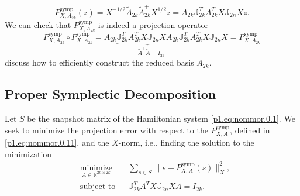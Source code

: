 \begin{equation} \label{p1.eq:nommor.0.11}
	P_{X,A_{2k}}^\text{symp}(z) = X^{-1/2} \tilde A_{2k} \tilde A_{2k}^+ X^{1/2} z = A_{2k} \mathbb J_{2k}^T A_{2k}^T X \mathbb J_{2n} X z.
\end{equation}
We can check that $P_{X,A_{2k}}^{\text{symp}}$ is indeed a projection operator
\begin{equation} \label{p1.eq:nommor.0.12}
	P_{X,A_{2k}}^\text{symp} \circ P_{X,A_{2k}}^\text{symp} = A_{2k} \underbrace{ \mathbb J_{2k}^T A_{2k}^T X \mathbb J_{2n} X A_{2k}}_{ =\tilde A^+ \tilde A = I_{2k} } \mathbb J_{2k}^T A_{2k}^T X \mathbb J_{2n} X = P_{X,A_{2k}}^\text{symp} 
\end{equation}
 discuss how to efficiently construct the reduced basis $A_{2k}$.

\subsection{Proper Symplectic Decomposition} \label{sec:normmor.1.1}
Let $S$ be the snapshot matrix of the Hamiltonian system \eqref{p1.eq:nommor.0.1}. We seek to minimize the projection error with respect to the $P_{X,A}^{\text{symp}}$, defined in \eqref{p1.eq:nommor.0.11}, and the $X$-norm, i.e., finding the solution to the minimization
\begin{equation} \label{eq:normmor.3}
\begin{aligned}
& \underset{A\in \mathbb{R}^{2n\times 2k}}{\text{minimize}}
& & \sum_{s\in S} \| s - P_{X,A}^{\text{symp}}(s) \|_X^2, \\
& \text{subject to}
& & \mathbb J_{2k}^T A^T X \mathbb J_{2n} X A = I_{2k}.
\end{aligned}
\end{equation}

